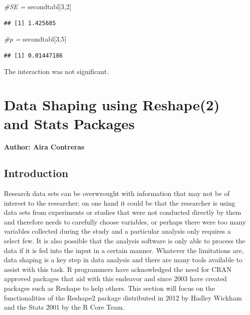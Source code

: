 \documentclass[]{book}
\newenvironment{Shaded}{\begin{snugshade}}{\end{snugshade}}
\newcommand{\CommentTok}[1]{\textcolor[rgb]{0.56,0.35,0.01}{\textit{#1}}}
\newcommand{\DecValTok}[1]{\textcolor[rgb]{0.00,0.00,0.81}{#1}}
\newcommand{\NormalTok}[1]{#1}
\begin{document}
\begin{Shaded}
\begin{Highlighting}[]
\CommentTok{#SE = }
\NormalTok{secondtabl[}\DecValTok{3}\NormalTok{,}\DecValTok{2}\NormalTok{]}
\end{Highlighting}
\end{Shaded}

\begin{verbatim}
## [1] 1.425685
\end{verbatim}

\begin{Shaded}
\begin{Highlighting}[]
\CommentTok{#p = }
\NormalTok{secondtabl[}\DecValTok{3}\NormalTok{,}\DecValTok{5}\NormalTok{]}
\end{Highlighting}
\end{Shaded}

\begin{verbatim}
## [1] 0.01447186
\end{verbatim}

The interaction was not significant.

\hypertarget{data-shaping-using-reshape2-and-stats-packages}{%
\chapter{Data Shaping using Reshape(2) and Stats Packages}\label{data-shaping-using-reshape2-and-stats-packages}}

\textbf{Author: Aira Contreras}

\hypertarget{introduction}{%
\section{Introduction}\label{introduction}}

Research data sets can be overwrought with information that may not be of interest to the researcher; on one hand it could be that the researcher is using data sets from experiments or studies that were not conducted directly by them and therefore needs to carefully choose variables, or perhaps there were too many variables collected during the study and a particular analysis only requires a select few. It is also possible that the analysis software is only able to process the data if it is fed into the input in a certain manner. Whatever the limitations are, data shaping is a key step in data analysis and there are many tools available to assist with this task. R programmers have acknowledged the need for CRAN approved packages that aid with this endeavor and since 2003 have created packages such as Reshape to help others. This section will focus on the functionalities of the Reshape2 package distributed in 2012 by Hadley Wickham and the Stats 2001 by the R Core Team.
\end{document}
